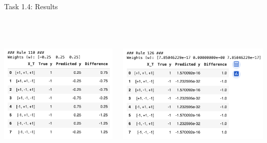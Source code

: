 \documentclass[aspectratio=169]{beamer}
\begin{document}
\begin{frame}{Task 1.4: Results}
\begin{columns}
    \begin{column}{0.42\textwidth}
        \includegraphics[width=7cm, height=7cm]{task_1.4_rule_110.png}
    \end{column}
    \begin{column}{0.57\textwidth}
        \includegraphics[width=9cm, height=7cm]{task_1.4_rule_126.png}
    \end{column}
\end{columns}
\end{frame}
\end{document}
